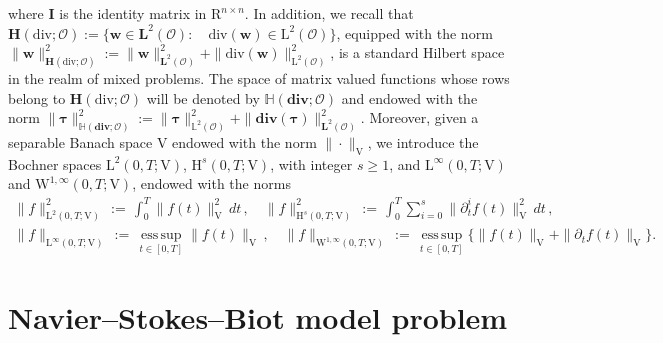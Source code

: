 \documentclass[11pt]{article}
\numberwithin{equation}{section}
\newcommand{\ds}{\displaystyle}
\newcommand{\btau}{{\boldsymbol\tau}}
\newcommand{\bw}{{\mathbf{w}}}
\newcommand{\0}{{\mathbf{0}}}
\def\bI{\mathbf{I}}
\newcommand{\bL}{\mathbf{L}}
\newcommand\bH{\mathbf{H}}
\newcommand\bbH{\mathbb{H}}
\newcommand\bbL{\mathbb{L}}
\newcommand{\cO}{\mathcal{O}}
\def\R{\mathrm{R}}
\def\H{\mathrm{H}}
\def\L{\mathrm{L}}
\def\V{\mathrm{V}}
\def\W{\mathrm{W}}
\def\esssup{\mathrm{ess\,sup}}
\def\bdiv{\mathbf{div}}
\def\div{\mathrm{div}}
\numberwithin{equation}{section}
\begin{document}
where $\bI$ is the identity matrix in $\R^{n\times n}$.
In addition, we recall that
$\bH(\div;\cO):=\Big\{ \bw\in\bL^2(\cO) :\quad \div(\bw)\in \L^2(\cO) \Big\}$,
equipped with the norm $\|\bw\|^2_{\bH(\div;\cO)} := \|\bw\|^2_{\bL^2(\cO)} + \|\div(\bw)\|^2_{\L^2(\cO)}$, is a standard Hilbert space in the realm of mixed problems.
The space of matrix valued functions whose rows belong to $\bH(\div;\cO)$ will be denoted by $\bbH(\bdiv;\cO)$ and endowed with the norm $\|\btau\|^2_{\bbH(\bdiv;\cO)} := \|\btau\|^2_{\bbL^2(\cO)} + \|\bdiv(\btau)\|^2_{\bL^2(\cO)}$. 
Moreover, given a separable Banach space $\V$ endowed with the norm $\| \cdot \|_{\V}$, we introduce
the Bochner spaces $\L^2(0,T;\V)$, $\H^s(0,T;\V)$, with integer $s \ge 1$,
and $\L^{\infty}(0,T;\V)$ and $\W^{1,\infty}(0,T;\V)$, endowed with the norms
\begin{equation*}
\begin{array}{c}
\ds\|f\|^{2}_{\L^{2}(0,T;\V)} \,:=\, \int^T_0 \|f(t)\|^{2}_{\V} \,dt \,,\quad
\ds\|f\|^2_{\H^s(0,T;\V)} \,:=\, \int^T_0 \sum^{s}_{i=0} \|\partial^{i}_t f(t)\|^2_{\V}\,dt\,, \\[3ex]
\ds\|f\|_{\L^\infty(0,T;\V)} \,:=\, \mathop{\esssup}\limits_{t\in [0,T]} \|f(t)\|_{\V}\, ,\quad \|f\|_{\W^{1,\infty}(0,T;\V)} \,:=\, \mathop{\esssup}\limits_{t\in [0,T]} \{\|f(t)\|_{\V} + \|\partial_t f(t)\|_{\V}\}.
\end{array}
\end{equation*}


\section{Navier--Stokes--Biot model problem}\label{sec:Navier-Stokes--Biot model problem}
\end{document}
